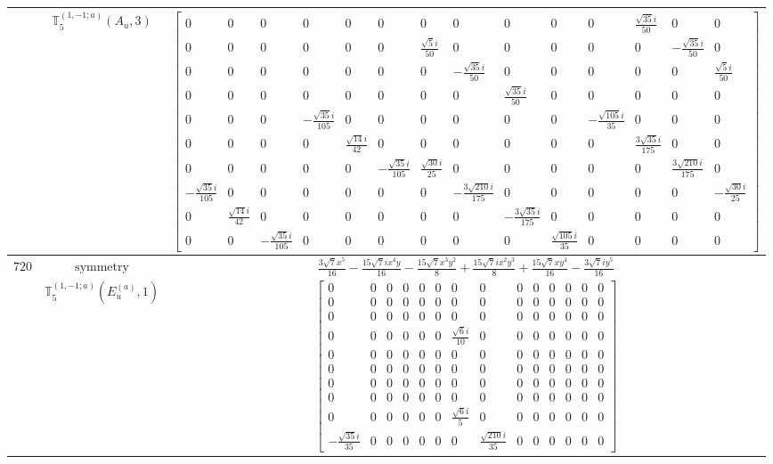 \documentclass[fleqn,8pt,landscape]{jsarticle}
\begin{document}
\begin{longtable}{ccc}
$  $ & $ \mathbb{T}_{5}^{(1,-1;a)}(A_{u},3) $ & $ \begin{bmatrix} 0 & 0 & 0 & 0 & 0 & 0 & 0 & 0 & 0 & 0 & 0 & \frac{\sqrt{35} i}{50} & 0 & 0 \\ 0 & 0 & 0 & 0 & 0 & 0 & \frac{\sqrt{5} i}{50} & 0 & 0 & 0 & 0 & 0 & - \frac{\sqrt{35} i}{50} & 0 \\ 0 & 0 & 0 & 0 & 0 & 0 & 0 & - \frac{\sqrt{35} i}{50} & 0 & 0 & 0 & 0 & 0 & \frac{\sqrt{5} i}{50} \\ 0 & 0 & 0 & 0 & 0 & 0 & 0 & 0 & \frac{\sqrt{35} i}{50} & 0 & 0 & 0 & 0 & 0 \\ 0 & 0 & 0 & - \frac{\sqrt{35} i}{105} & 0 & 0 & 0 & 0 & 0 & 0 & - \frac{\sqrt{105} i}{35} & 0 & 0 & 0 \\ 0 & 0 & 0 & 0 & \frac{\sqrt{14} i}{42} & 0 & 0 & 0 & 0 & 0 & 0 & \frac{3 \sqrt{35} i}{175} & 0 & 0 \\ 0 & 0 & 0 & 0 & 0 & - \frac{\sqrt{35} i}{105} & \frac{\sqrt{30} i}{25} & 0 & 0 & 0 & 0 & 0 & \frac{3 \sqrt{210} i}{175} & 0 \\ - \frac{\sqrt{35} i}{105} & 0 & 0 & 0 & 0 & 0 & 0 & - \frac{3 \sqrt{210} i}{175} & 0 & 0 & 0 & 0 & 0 & - \frac{\sqrt{30} i}{25} \\ 0 & \frac{\sqrt{14} i}{42} & 0 & 0 & 0 & 0 & 0 & 0 & - \frac{3 \sqrt{35} i}{175} & 0 & 0 & 0 & 0 & 0 \\ 0 & 0 & - \frac{\sqrt{35} i}{105} & 0 & 0 & 0 & 0 & 0 & 0 & \frac{\sqrt{105} i}{35} & 0 & 0 & 0 & 0 \end{bmatrix} $ \\ \hline
$ 720 $ & $ \text{symmetry} $ & $ \frac{3 \sqrt{7} x^{5}}{16} - \frac{15 \sqrt{7} i x^{4} y}{16} - \frac{15 \sqrt{7} x^{3} y^{2}}{8} + \frac{15 \sqrt{7} i x^{2} y^{3}}{8} + \frac{15 \sqrt{7} x y^{4}}{16} - \frac{3 \sqrt{7} i y^{5}}{16} $ \\
$  $ & $ \mathbb{T}_{5}^{(1,-1;a)}(E_{u}^{(a)},1) $ & $ \begin{bmatrix} 0 & 0 & 0 & 0 & 0 & 0 & 0 & 0 & 0 & 0 & 0 & 0 & 0 & 0 \\ 0 & 0 & 0 & 0 & 0 & 0 & 0 & 0 & 0 & 0 & 0 & 0 & 0 & 0 \\ 0 & 0 & 0 & 0 & 0 & 0 & 0 & 0 & 0 & 0 & 0 & 0 & 0 & 0 \\ 0 & 0 & 0 & 0 & 0 & 0 & \frac{\sqrt{6} i}{10} & 0 & 0 & 0 & 0 & 0 & 0 & 0 \\ 0 & 0 & 0 & 0 & 0 & 0 & 0 & 0 & 0 & 0 & 0 & 0 & 0 & 0 \\ 0 & 0 & 0 & 0 & 0 & 0 & 0 & 0 & 0 & 0 & 0 & 0 & 0 & 0 \\ 0 & 0 & 0 & 0 & 0 & 0 & 0 & 0 & 0 & 0 & 0 & 0 & 0 & 0 \\ 0 & 0 & 0 & 0 & 0 & 0 & 0 & 0 & 0 & 0 & 0 & 0 & 0 & 0 \\ 0 & 0 & 0 & 0 & 0 & 0 & \frac{\sqrt{6} i}{5} & 0 & 0 & 0 & 0 & 0 & 0 & 0 \\ - \frac{\sqrt{35} i}{35} & 0 & 0 & 0 & 0 & 0 & 0 & \frac{\sqrt{210} i}{35} & 0 & 0 & 0 & 0 & 0 & 0 \end{bmatrix} $ \\ \hline

\end{longtable}
\end{document}
